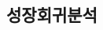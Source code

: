 \documentclass[handout, 10pt]{beamer}
\begin{document}
\subsection{성장회귀분석}
\begin{frame}
    \begin{table}[htbp]
        \begin{adjustbox}{width=\textwidth, totalheight=\baselineskip,keepaspectratio}
            \begin{threeparttable}
                
            \end{threeparttable}
        \end{adjustbox}
    \end{table}
\end{frame}

\begin{frame}
    \begin{table}[htbp]
        \begin{adjustbox}{width=\textwidth, totalheight=\baselineskip,keepaspectratio}
            \begin{threeparttable}
                
            \end{threeparttable}
        \end{adjustbox}
    \end{table}
\end{frame}

\begin{frame}
    \begin{table}[htbp]
        \begin{adjustbox}{width=\textwidth, totalheight=\baselineskip,keepaspectratio}
            \begin{threeparttable}
                
            \end{threeparttable}
        \end{adjustbox}
    \end{table}
\end{frame}

\begin{frame}
    \begin{table}[htbp]
        \begin{adjustbox}{width=\textwidth, totalheight=\baselineskip,keepaspectratio}
            \begin{threeparttable}
                
            \end{threeparttable}
        \end{adjustbox}
    \end{table}
\end{frame}
\end{document}
